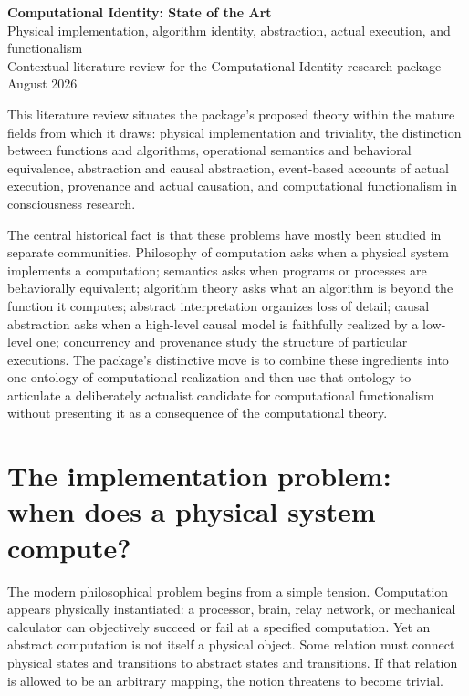 \documentclass[11pt,a4paper]{article}
\begin{document}
\begin{center}
{\LARGE\bfseries\color{navy} Computational Identity: State of the Art}\\[2mm]
{\Large Physical implementation, algorithm identity, abstraction, actual execution, and functionalism}\\[3mm]
{\large Contextual literature review for the Computational Identity research package}\\[3mm]
{\small August 2026}
\end{center}

\begin{mapbox}[title={Scope and purpose}]
This literature review situates the package's proposed theory within the mature fields from which it draws: physical implementation and triviality, the distinction between functions and algorithms, operational semantics and behavioral equivalence, abstraction and causal abstraction, event-based accounts of actual execution, provenance and actual causation, and computational functionalism in consciousness research.

The central historical fact is that these problems have mostly been studied in separate communities. Philosophy of computation asks when a physical system implements a computation; semantics asks when programs or processes are behaviorally equivalent; algorithm theory asks what an algorithm is beyond the function it computes; abstract interpretation organizes loss of detail; causal abstraction asks when a high-level causal model is faithfully realized by a low-level one; concurrency and provenance study the structure of particular executions. The package's distinctive move is to combine these ingredients into one ontology of computational realization and then use that ontology to articulate a deliberately actualist candidate for computational functionalism without presenting it as a consequence of the computational theory.
\end{mapbox}

\section{The implementation problem: when does a physical system compute?}

The modern philosophical problem begins from a simple tension. Computation appears physically instantiated: a processor, brain, relay network, or mechanical calculator can objectively succeed or fail at a specified computation. Yet an abstract computation is not itself a physical object. Some relation must connect physical states and transitions to abstract states and transitions. If that relation is allowed to be an arbitrary mapping, the notion threatens to become trivial.
\end{document}
